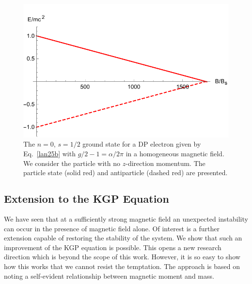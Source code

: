 \documentclass[epj]{svjour}
\begin{document}
\begin{figure}
 \centering
 \includegraphics[clip, trim=0.0cm 0.0cm 0.0cm 0.5cm,width=\linewidth]{lanplot02}
 \caption[]{The $n=0$, $s=1/2$ ground state for a DP electron given by Eq.~\eqref{lan25b} with $g/2-1=\alpha/2\pi$ in a homogeneous magnetic field. We consider the particle with no $z$-direction momentum. The particle state (solid red) and antiparticle (dashed red) are presented.}
 \label{f02}
\end{figure}

\subsection{Extension to the KGP Equation}\label{IKGP}
We have seen that at a sufficiently strong magnetic field an unexpected instability can occur in the presence of magnetic field alone. Of interest is a further extension capable of restoring the stability of the system. We show that such an improvement of the KGP equation is possible. This opens a new research direction which is beyond the scope of this work. However, it is so easy to show how this works that we cannot resist the temptation. The approach is based on noting a self-evident relationship between magnetic moment and mass. 
\end{document}
